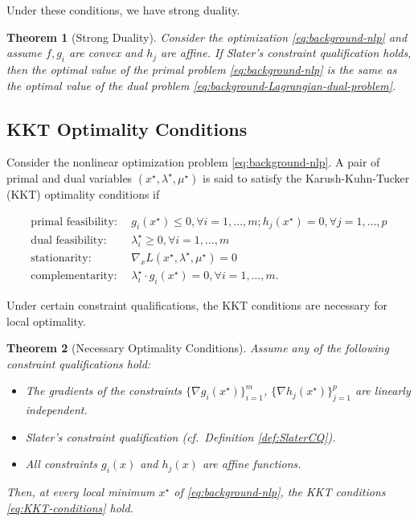 \documentclass[
]{book}
\newtheorem{theorem}{Theorem}[chapter]
\theoremstyle{definition}
\theoremstyle{definition}
\theoremstyle{definition}
\theoremstyle{definition}
\theoremstyle{remark}
\begin{document}
Under these conditions, we have strong duality.

\begin{theorem}[Strong Duality]
\protect\hypertarget{thm:StrongDuality}{}\label{thm:StrongDuality}Consider the optimization \eqref{eq:background-nlp} and assume \(f,g_i\) are convex and \(h_j\) are affine. If Slater's constraint qualification holds, then the optimal value of the primal problem \eqref{eq:background-nlp} is the same as the optimal value of the dual problem \eqref{eq:background-Lagrangian-dual-problem}.
\end{theorem}

\subsection{KKT Optimality Conditions}\label{kkt-optimality-conditions}

Consider the nonlinear optimization problem \eqref{eq:background-nlp}. A pair of primal and dual variables \((x^\star,\lambda^\star,\mu^\star)\) is said to satisfy the Karush-Kuhn-Tucker (KKT) optimality conditions if

\begin{equation}
\begin{split}
\text{primal feasibility}:\ \  & g_i(x^\star) \leq 0,\forall i=1,\dots,m; h_j(x^\star) = 0, \forall j=1,\dots,p \\
\text{dual feasibility}:\ \  & \lambda_i^\star \geq 0, \forall i=1,\dots,m \\
\text{stationarity}:\ \  & \nabla_x L(x^\star,\lambda^\star,\mu^\star) = 0 \\
\text{complementarity}:\ \  & \lambda_i^\star \cdot g_i(x^\star) = 0, \forall i=1,\dots,m.
\end{split}
\label{eq:KKT-conditions}
\end{equation}

Under certain constraint qualifications, the KKT conditions are necessary for local optimality.

\begin{theorem}[Necessary Optimality Conditions]
\protect\hypertarget{thm:KKTNecessary}{}\label{thm:KKTNecessary}Assume any of the following constraint qualifications hold:

\begin{itemize}
\item
  The gradients of the constraints \(\{ \nabla g_i(x^\star) \}_{i=1}^m\), \(\{ \nabla h_j(x^\star) \}_{j=1}^p\) are linearly independent.
\item
  Slater's constraint qualification (cf.~Definition \ref{def:SlaterCQ}).
\item
  All constraints \(g_i(x)\) and \(h_j(x)\) are affine functions.
\end{itemize}

Then, at every local minimum \(x^\star\) of \eqref{eq:background-nlp}, the KKT conditions \eqref{eq:KKT-conditions} hold.
\end{theorem}
\end{document}

